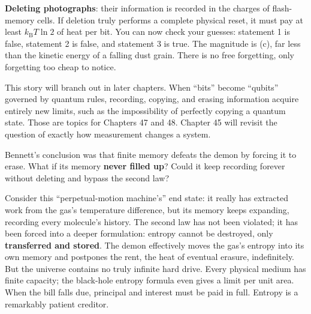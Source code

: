 \textbf{Deleting photographs}: their information is recorded in the charges of flash-memory cells. If deletion truly performs a complete physical reset, it must pay at least $k_{\mathrm{B}}T\ln2$ of heat per bit. You can now check your guesses: statement 1 is false, statement 2 is false, and statement 3 is true. The magnitude is (c), far less than the kinetic energy of a falling dust grain. There is no free forgetting, only forgetting too cheap to notice.


This story will branch out in later chapters. When ``bits'' become ``qubits'' governed by quantum rules, recording, copying, and erasing information acquire entirely new limits, such as the impossibility of perfectly copying a quantum state. Those are topics for Chapters 47 and 48. Chapter 45 will revisit the question of exactly how measurement changes a system.

\begin{thought}
Bennett's conclusion was that finite memory defeats the demon by forcing it to erase. What if its memory \textbf{never filled up}? Could it keep recording forever without deleting and bypass the second law?

Consider this ``perpetual-motion machine's'' end state: it really has extracted work from the gas's temperature difference, but its memory keeps expanding, recording every molecule's history. The second law has not been violated; it has been forced into a deeper formulation: entropy cannot be destroyed, only \textbf{transferred and stored}. The demon effectively moves the gas's entropy into its own memory and postpones the rent, the heat of eventual erasure, indefinitely. But the universe contains no truly infinite hard drive. Every physical medium has finite capacity; the black-hole entropy formula even gives a limit per unit area. When the bill falls due, principal and interest must be paid in full. Entropy is a remarkably patient creditor.
\end{thought}

